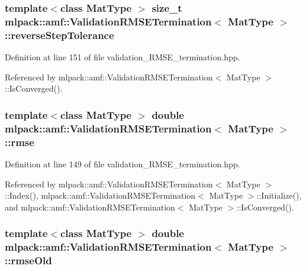 \subsubsection[{reverse\-Step\-Tolerance}]{\setlength{\rightskip}{0pt plus 5cm}template$<$class Mat\-Type $>$ size\-\_\-t {\bf mlpack\-::amf\-::\-Validation\-R\-M\-S\-E\-Termination}$<$ Mat\-Type $>$\-::reverse\-Step\-Tolerance\hspace{0.3cm}{\ttfamily [private]}}\label{classmlpack_1_1amf_1_1ValidationRMSETermination_aa9c814c6c353ee046e0eed93b16074b8}


Definition at line 151 of file validation\-\_\-\-R\-M\-S\-E\-\_\-termination.\-hpp.



Referenced by mlpack\-::amf\-::\-Validation\-R\-M\-S\-E\-Termination$<$ Mat\-Type $>$\-::\-Is\-Converged().

\subsubsection[{rmse}]{\setlength{\rightskip}{0pt plus 5cm}template$<$class Mat\-Type $>$ double {\bf mlpack\-::amf\-::\-Validation\-R\-M\-S\-E\-Termination}$<$ Mat\-Type $>$\-::rmse\hspace{0.3cm}{\ttfamily [private]}}\label{classmlpack_1_1amf_1_1ValidationRMSETermination_a1c6e6532e567aa2001403fd9f58c769f}


Definition at line 149 of file validation\-\_\-\-R\-M\-S\-E\-\_\-termination.\-hpp.



Referenced by mlpack\-::amf\-::\-Validation\-R\-M\-S\-E\-Termination$<$ Mat\-Type $>$\-::\-Index(), mlpack\-::amf\-::\-Validation\-R\-M\-S\-E\-Termination$<$ Mat\-Type $>$\-::\-Initialize(), and mlpack\-::amf\-::\-Validation\-R\-M\-S\-E\-Termination$<$ Mat\-Type $>$\-::\-Is\-Converged().

\subsubsection[{rmse\-Old}]{\setlength{\rightskip}{0pt plus 5cm}template$<$class Mat\-Type $>$ double {\bf mlpack\-::amf\-::\-Validation\-R\-M\-S\-E\-Termination}$<$ Mat\-Type $>$\-::rmse\-Old\hspace{0.3cm}{\ttfamily [private]}}\label{classmlpack_1_1amf_1_1ValidationRMSETermination_a5a5bdd5602605056d6d225ab31c9db1c}


